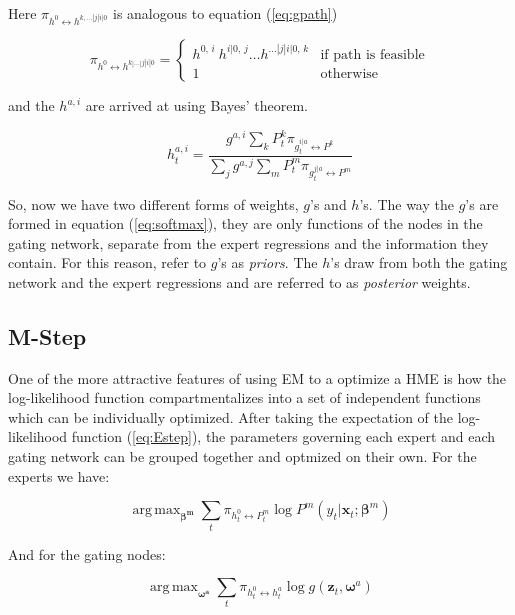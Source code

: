 \documentclass[12pt]{article}
\newcommand{\gateprod}[2]{\pi_{#1 \longleftrightarrow #2}}
\newcommand{\shortsum}[1]{\sum \nolimits_{#1}}
\newcommand{\h}[2]{h^{#1}_{#2}}
\DeclareMathOperator*{\argmax}{arg\,max}
\begin{document}
Here $\gateprod{h^{0}}{h^{k,\dots|j|i|0}}$ is analogous to equation (\ref{eq:gpath})

\begin{equation} \label{eq:hpath}
  \gateprod{h^{0}}{h^{k|\ldots|j|i|0}} =
    \begin{cases} 
       h^{0, \, i} \ h^{i|0, \, j} \ldots h^{\dots|j|i|0, \, k} & \textrm{if path is feasible} \\
       1 & \textrm{otherwise}
    \end{cases}
\end{equation}

and the $h^{a, i}$ are arrived at using Bayes' theorem.

\begin{equation} \label{eq:posteriornode}
  \h{a,i}{t} = \frac{g^{a, i} \shortsum{k} P^{k}_{t} \gateprod{g^{i|a}_{t}}{P^{k}}}{\shortsum{j} g^{a, j} \shortsum{m} P^{m}_{t} \gateprod{g^{j|a}_{t}}{P^{m}}}
\end{equation}


So, now we have two different forms of weights, $g$'s and $h$'s. The
way the $g$'s are formed in equation (\ref{eq:softmax}), they are only
functions of the nodes in the gating network, separate from the
expert regressions and the information they contain. For this reason,
\cite{JordanJacobs1993} refer to $g$'s as \textit{priors}.
The $h$'s draw from both the gating network and the expert regressions and
are referred to as \textit{posterior} weights.


\subsection{M-Step}

One of the more attractive features of using EM to a optimize a
HME is how the log-likelihood function compartmentalizes into a set 
of independent functions which can be individually optimized. After
taking the expectation of the log-likelihood function (\ref{eq:Estep}), the
parameters governing each expert and each gating network can be grouped
together and optmized on their own. For the experts we have:

\begin{equation}
  \argmax_{\boldsymbol{\beta^{m}}} \sum_{t} \gateprod{h^{0}_{t}}{P^{m}_{t}} \log P^{m} (y_{t}| \boldsymbol{x}_{t}; \boldsymbol{\beta}^{m})
\end{equation}

And for the gating nodes:

\begin{equation}
  \argmax_{\boldsymbol{\omega^{a}}} \sum_{t} \gateprod{h^{0}_{t}}{h^{a}_{t}} \log g( \boldsymbol{z}_{t}, \boldsymbol{\omega}^{a})
\end{equation}
\end{document}
